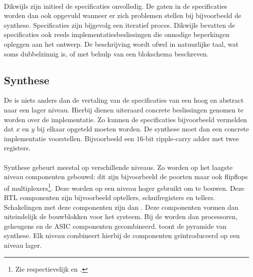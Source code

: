 \paragraph{}
Dikwijls zijn initieel de specificaties onvolledig. De gaten in de specificaties worden dan ook opgevuld wanneer er zich problemen stellen bij bijvoorbeeld de synthese. Specificaties zijn bijgevolg een iteratief proces. Dikwijls bevatten de specificaties ook reeds implementatiesbeslissingen die onnodige beperkingen opleggen aan het ontwerp. De beschrijving wordt ofwel in natuurlijke taal, wat soms dubbelzinnig is, of met behulp van een blokschema beschreven.

\subsection{Synthese}
De  is niets anders dan de vertaling van de specificaties van een hoog en abstract naar een lager niveau. Hierbij dienen uiteraard concrete beslissingen genomen te worden over de implementatie. Zo kunnen de specificaties bijvoorbeeld vermelden dat $x$ en $y$ bij elkaar opgeteld moeten worden. De synthese moet dan een concrete implementatie voorstellen. Bijvoorbeeld een $16$-bit ripple-carry adder met twee registers.

\paragraph{}
Synthese gebeurt meestal op verschillende niveaus. Zo worden op het laagste niveau componenten gebouwd: dit zijn bijvoorbeeld de poorten maar ook flipflops of multiplexers\footnote{Zie respectievelijk  en .}. Deze worden op een niveau hoger gebruikt om  te bouwen. Deze RTL componenten zijn bijvoorbeeld optellers, schuifregisters en tellers. Schakelingen met deze componenten zijn dan . Deze componenten vormen dan uiteindelijk de bouwblokken voor het systeem. Bij de  worden dan processoren, geheugens en de ASIC componenten gecombineerd.  toont de pyramide van synthese. Elk niveau combineert hierbij de componenten ge\"introduceerd op een niveau lager.%

